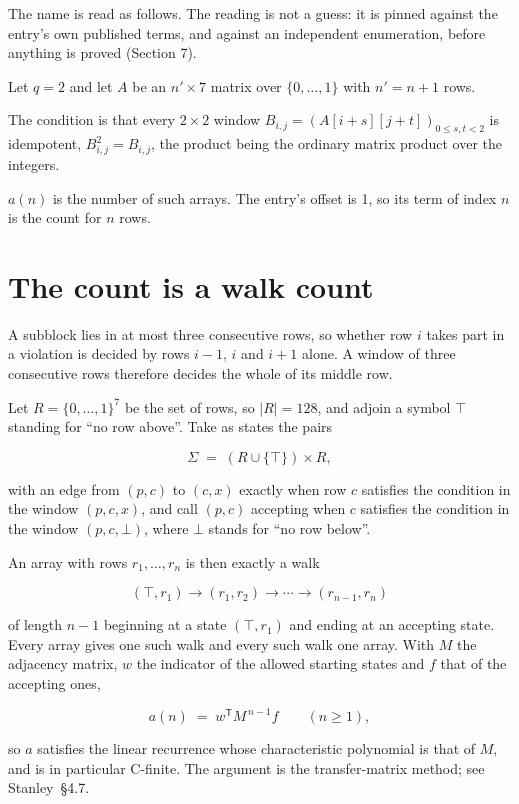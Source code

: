 \documentclass[11pt]{article}
\theoremstyle{definition}
\begin{document}
The name is read as follows. The reading is not a guess: it is pinned against the entry's own published terms, and against an independent enumeration, before anything is proved (Section 7).

Let $q = 2$ and let $A$ be an $n' \times 7$ matrix over $\{0,\dots,1\}$ with $n' = n + 1$ rows.

The condition is that every $2 \times 2$ window $B_{i,j} = (A[i{+}s][j{+}t])_{0 \le s,t < 2}$ is idempotent, $B_{i,j}^2 = B_{i,j}$, the product being the ordinary matrix product over the integers.

$a(n)$ is the number of such arrays. The entry's offset is 1, so its term of index $n$ is the count for $n$ rows.

\section{The count is a walk count}

A subblock lies in at most three consecutive rows, so whether row $i$ takes part in a violation is decided by rows $i-1$, $i$ and $i+1$ alone. A window of three consecutive rows therefore decides the whole of its middle row.

Let $R = \{0,\dots,1\}^{7}$ be the set of rows, so $|R| = 128$, and adjoin a symbol $\top$ standing for ``no row above''. Take as states the pairs

\[\Sigma \;=\; (R \cup \{\top\}) \times R,\]

with an edge from $(p,c)$ to $(c,x)$ exactly when row $c$ satisfies the condition in the window $(p,c,x)$, and call $(p,c)$ accepting when $c$ satisfies the condition in the window $(p,c,\bot)$, where $\bot$ stands for ``no row below''.

An array with rows $r_1,\dots,r_n$ is then exactly a walk

\[(\top,r_1) \to (r_1,r_2) \to \cdots \to (r_{n-1},r_n)\]

of length $n-1$ beginning at a state $(\top,r_1)$ and ending at an accepting state. Every array gives one such walk and every such walk one array. With $M$ the adjacency matrix, $w$ the indicator of the allowed starting states and $f$ that of the accepting ones,

\[a(n) \;=\; w^{\mathsf T} M^{\,n-1} f \qquad (n \ge 1),\]

so $a$ satisfies the linear recurrence whose characteristic polynomial is that of $M$, and is in particular C-finite. The argument is the transfer-matrix method; see Stanley~\S4.7.
\end{document}
